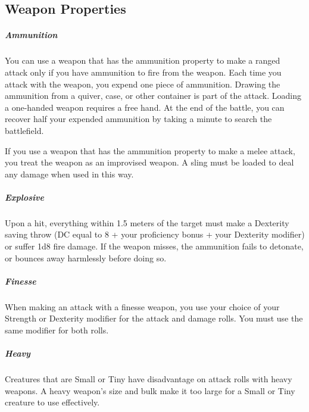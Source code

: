 

\subsection*{Weapon Properties} \label{ssec::weaponproperties}
    \subparagraph{Ammunition}
        You can use a weapon that has the ammunition property to make a ranged attack only if you have ammunition to fire from the weapon.
        Each time you attack with the weapon, you expend one piece of ammunition.
        Drawing the ammunition from a quiver, case, or other container is part of the attack.
        Loading a one-handed weapon requires a free hand.
        At the end of the battle, you can recover half your expended ammunition by taking a minute to search the battlefield.

        If you use a weapon that has the ammunition property to make a melee attack, you treat the weapon as an improvised weapon.
        A sling must be loaded to deal any damage when used in this way.
    \subparagraph{Explosive}
        Upon a hit, everything within 1.5 meters of the target must make a Dexterity saving throw (DC equal to 8 + your proficiency bonus + your Dexterity modifier) or suffer 1d8 fire damage.
        If the weapon misses, the ammunition fails to detonate, or bounces away harmlessly before doing so.
    \subparagraph{Finesse}
        When making an attack with a finesse weapon, you use your choice of your Strength or Dexterity modifier for the attack and damage rolls.
        You must use the same modifier for both rolls.
    \subparagraph{Heavy}
        Creatures that are Small or Tiny have disadvantage on attack rolls with heavy weapons.
        A heavy weapon's size and bulk make it too large for a Small or Tiny creature to use effectively.

